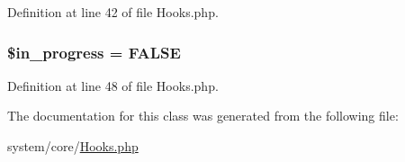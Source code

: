 Definition at line 42 of file Hooks.\-php.

\hypertarget{class_c_i___hooks_a716cd4dd6525620af7e3f514582b1438}{
\subsubsection[{\$in\-\_\-progress}]{\setlength{\rightskip}{0pt plus 5cm}\$in\-\_\-progress = F\-A\-L\-S\-E}}\label{class_c_i___hooks_a716cd4dd6525620af7e3f514582b1438}


Definition at line 48 of file Hooks.\-php.



The documentation for this class was generated from the following file\-:\begin{DoxyCompactItemize}
\item 
system/core/\hyperlink{system_2core_2hooks_8php}{Hooks.\-php}\end{DoxyCompactItemize}
